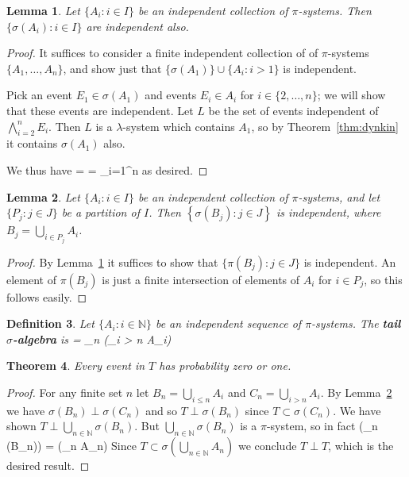 \documentclass[11pt,a4paper]{article}
\newtheorem{theorem}{Theorem}
\newtheorem{lemma}[theorem]{Lemma}
\newtheorem{definition}[theorem]{Definition}
\newcommand*{\defn}[1]{\textbf{#1}}
\newcommand*{\N}[0]{\mathbb{N}}
\def\[#1\]{\begin{align*}#1\end{align*}}
\begin{document}
\begin{lemma}
  \label{lem:pi ind}
  Let $\{A_i : i \in I\}$ be an independent collection of $\pi$-systems.
  Then $\{\sigma(A_i) : i \in I\}$ are independent also.
\end{lemma}
\begin{proof}
  It suffices to consider a finite independent collection of of $\pi$-systems $\{A_1, \dots, A_n\}$, and show just that $\{\sigma(A_1)\} \cup \{A_i : i > 1\}$ is independent.

  Pick an event $E_1 \in \sigma(A_1)$
  and events $E_i \in A_i$ for $i \in \{2, \dots, n\}$; we will show that these events are independent.
  Let $L$ be the set of events independent of $\bigwedge_{i=2}^n E_i$.
  Then $L$ is a $\lambda$-system which contains $A_1$, so by Theorem~\ref{thm:dynkin} it contains $\sigma(A_1)$ also.

  We thus have
  \[
  \Pr\left[\bigwedge_{i=1}^n E_i\right]
   = \Pr[E_1]\Pr\left[\bigwedge_{i=2}^n E_i\right]
   = \prod_{i=1}^{n} \Pr[E_i]
  \]
  as desired.
\end{proof}

\begin{lemma}
  \label{lem:partition ind}
  Let $\{A_i : i \in I\}$ be an independent collection of $\pi$-systems,
  and let $\{P_j : j \in J\}$ be a partition of $I$.
  Then $\left\{\sigma(B_j) : j \in J\right\}$ is independent, where $B_j = \bigcup_{i \in P_j} A_i$.
\end{lemma}
\begin{proof}
  By Lemma~\ref{lem:pi ind} it suffices to show that
  $\{\pi(B_j) : j \in J\}$ is independent.
  An element of $\pi(B_j)$ is just a finite intersection
  of elements of $A_i$ for $i \in P_j$,
  so this follows easily.
\end{proof}

\begin{definition}
  Let $\{A_i : i \in \N\}$ be an independent sequence of $\pi$-systems.
  The \defn{tail $\sigma$-algebra} is \[T = \bigcap_{n \in \N} \sigma\left(\bigcup_{i > n} A_i\right)\]
\end{definition}

\begin{theorem}
  Every event in $T$ has probability zero or one.
\end{theorem}
\begin{proof}
  For any finite set $n$ let $B_n = \bigcup_{i \le n} A_i$ and $C_n = \bigcup_{i > n} A_i$.
  By Lemma~\ref{lem:partition ind} we have $\sigma(B_n) \perp \sigma(C_n)$ and so $T \perp \sigma(B_n)$ since $T \subset \sigma(C_n)$.
  We have shown $T \perp \bigcup_{n \in \N} \sigma(B_n)$.  But $\bigcup_{n \in \N} \sigma(B_n)$ is a $\pi$-system, so in fact
  \[T \perp \sigma\left(\bigcup_{n \in \N} \sigma(B_n)\right) = \sigma\left(\bigcup_{n \in \N} A_n\right)\]
  Since $T \subset \sigma\left(\bigcup_{n \in \N} A_n\right)$
  we conclude $T \perp T$, which is the desired result.
\end{proof}
\end{document}
